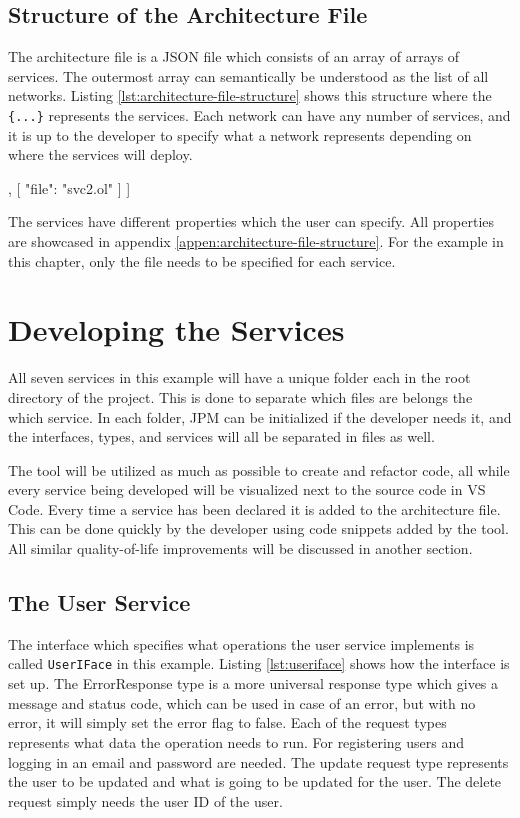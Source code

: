 \subsection{Structure of the Architecture File}
The architecture file is a JSON file which consists of an array of arrays of services. The outermost array can semantically be understood as the list of all networks.
Listing \ref*{lst:architecture-file-structure} shows this structure where the \texttt{\{...\}} represents the services. Each network can have any number of services, and it is up to the
developer to specify what a network represents depending on where the services will deploy.

\begin{jsonlisting}[][caption={Structure of the architecture JSON file showing two networks.}, label=lst:architecture-file-structure]
[
    [
        { "file": "svc1.ol" }
    ],
    [
        { "file": "svc2.ol" }
    ]
]
\end{jsonlisting}

The services have different properties which the user can specify. All properties are showcased in appendix \ref*{appen:architecture-file-structure}.
For the example in this chapter, only the file needs to be specified for each service.

\section{Developing the Services}
All seven services in this example will have a unique folder each in the root directory of the project. This is done to separate which files are belongs the which service.
In each folder, JPM can be initialized if the developer needs it, and the interfaces, types, and services will all be separated in files as well.

The tool will be utilized as much as possible to create and refactor code, all while every service being developed will be visualized next to the source code in VS Code.
Every time a service has been declared it is added to the architecture file. This can be done quickly by the developer using code snippets added by the tool. All similar quality-of-life improvements will be discussed in another section.
\subsection{The User Service}
The interface which specifies what operations the user service implements is called \texttt{UserIFace} in this example.
Listing \ref*{lst:useriface} shows how the interface is set up. The ErrorResponse type is a more universal response type which gives a message and status code, which can be used in case of an error, but with no error, it will simply set the error flag to false.
Each of the request types represents what data the operation needs to run. For registering users and logging in an email and password are needed. The update request type represents the user to be updated and what is going to be updated for the user. The delete request simply needs the user ID of the user.

